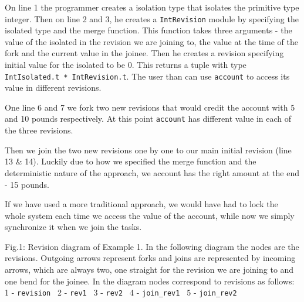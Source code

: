 \documentclass[12pt,twoside,notitlepage]{report}
\begin{document}
 
On line 1 the programmer creates a isolation type that isolates the primitive type integer. Then on line 2 and 3, he creates a {\tt IntRevision} module by specifying the isolated type and the merge function. This function takes three arguments - the value of the isolated in the revision we are joining to, the value at the time of the fork and the current value in the joinee. Then he creates a revision specifying initial value for the isolated to be 0. This returns a tuple with type {\tt IntIsolated.t * IntRevision.t}. The user than can use {\tt account} to access its value in different revisions. 

One line 6 and 7 we fork two new revisions that would credit the account with 5 and 10 pounds respectively. At this point {\tt account} has different value in each of the three revisions.

Then we join the two new revisions one by one to our main initial revision (line 13 \& 14). Luckily due to how we specified the merge function and the deterministic nature of the approach, we account has the right amount at the end - 15 pounds.

If we have used a more traditional approach, we would have had to lock the whole system each time we access the value of the account, while now we simply synchronize it when we join the tasks. 

 
Fig.1: Revision diagram of Example 1. In the following diagram the nodes are the revisions. Outgoing arrows represent forks and  joins are represented by incoming arrows, which are always two, one straight for the revision we are joining to and one bend for the joinee. In the diagram nodes correspond to revisions as follows: 1 - {\tt revision } 2 - {\tt rev1 } 3 - {\tt rev2 } 4 - {\tt join\_rev1 } 5 - {\tt join\_rev2}  
\end{document}
